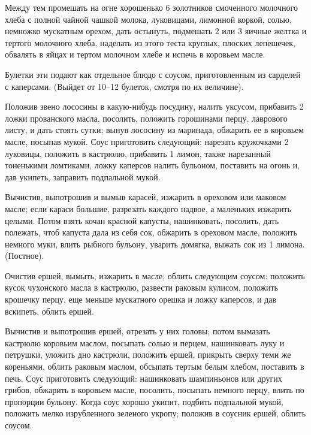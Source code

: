Между тем промешать на огне хорошенько 6 золотников смоченного молочного хлеба с полной чайной чашкой молока, луковицами, лимонной коркой, солью, немножко мускатным орехом, дать остынуть, подмешать 2 или 3 яичные желтка и тертого молочного хлеба, наделать из этого теста круглых, плоских лепешечек, обвалять в яйцах и тертом молочном хлебе и испечь в коровьем масле. 

Булетки эти подают как отдельное блюдо с соусом, приготовленным из сарделей с каперсами. (Выйдет от 10--12 булеток, смотря по их величине). 


Положив звено лососины в какую-нибудь посудину, налить уксусом, прибавить 2 ложки прованского масла, посолить, положить горошинами перцу, лаврового листу, и дать стоять сутки; вынув лососину из маринада, обжарить ее в коровьем масле, посыпав мукой. Соус приготовить следующий: нарезать кружочками 2 луковицы, положить в кастрюлю, прибавить 1 лимон, также нарезанный тоненькими ломтиками, ложку каперсов налить бульоном, поставить на огонь и, дав укипеть, заправить подпальной мукой. 


Вычистив, выпотрошив и вымыв карасей, изжарить в ореховом или маковом масле; если караси большие, разрезать каждого надвое, а маленьких изжарить целыми. Потом взять кочан красной капусты, нашинковать, посолить, дать полежать, чтоб капуста дала из себя сок, обжарить в ореховом масле, положить немного муки, влить рыбного бульону, уварить домягка, выжать сок из 1 лимона. (Постное). 


Очистив ершей, вымыть, изжарить в масле; облить следующим соусом: положить кусок чухонского масла в кастрюлю, развести раковым кулисом, положить крошечку перцу, еще меньше мускатного орешка и ложку каперсов, и дав вскипеть, облить ершей. 


Вычистив и выпотрошив ершей, отрезать у них головы; потом вымазать кастрюлю коровьим маслом, посыпать солью и перцем, нашинковать луку и петрушки, уложить дно кастрюли, положить ершей, прикрыть сверху теми же кореньями, облить раковым маслом, обсыпать тертым белым хлебом, поставить в печь. Соус приготовить следующий: нашинковать шампиньонов или других грибов, обжарить в коровьем масле, посолить, посыпать немного перцу, влить по пропорции бульону. Когда соус хорошо укипит, подбить подпальной мукой, положить мелко изрубленного зеленого укропу; положив в соусник ершей, облить соусом. 

